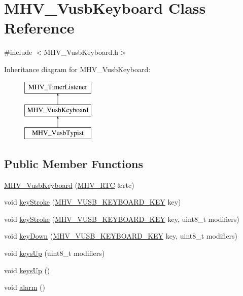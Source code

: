 \hypertarget{class_m_h_v___vusb_keyboard}{
\section{\-M\-H\-V\-\_\-\-Vusb\-Keyboard \-Class \-Reference}
\label{class_m_h_v___vusb_keyboard}
}


{\ttfamily \#include $<$\-M\-H\-V\-\_\-\-Vusb\-Keyboard.\-h$>$}

\-Inheritance diagram for \-M\-H\-V\-\_\-\-Vusb\-Keyboard\-:\begin{figure}[H]
\begin{center}
\leavevmode
\includegraphics[height=3.000000cm]{class_m_h_v___vusb_keyboard}
\end{center}
\end{figure}
\subsection*{\-Public \-Member \-Functions}
\begin{DoxyCompactItemize}
\item 
\hyperlink{class_m_h_v___vusb_keyboard_a97774c8ba7d4d9b736de5da63349a0b2}{\-M\-H\-V\-\_\-\-Vusb\-Keyboard} (\hyperlink{class_m_h_v___r_t_c}{\-M\-H\-V\-\_\-\-R\-T\-C} \&rtc)
\item 
void \hyperlink{class_m_h_v___vusb_keyboard_a01b3de864f8320c23118ac2ff34ca7a7}{key\-Stroke} (\hyperlink{_m_h_v___vusb_keyboard_8h_a03702cf5dad1661f75eda7bd2e33acb6}{\-M\-H\-V\-\_\-\-V\-U\-S\-B\-\_\-\-K\-E\-Y\-B\-O\-A\-R\-D\-\_\-\-K\-E\-Y} key)
\item 
void \hyperlink{class_m_h_v___vusb_keyboard_a6d2161121f4eaef0e41e2b6af956155f}{key\-Stroke} (\hyperlink{_m_h_v___vusb_keyboard_8h_a03702cf5dad1661f75eda7bd2e33acb6}{\-M\-H\-V\-\_\-\-V\-U\-S\-B\-\_\-\-K\-E\-Y\-B\-O\-A\-R\-D\-\_\-\-K\-E\-Y} key, uint8\-\_\-t modifiers)
\item 
void \hyperlink{class_m_h_v___vusb_keyboard_a879506b2ef1622e09070a9ccf11fdd10}{key\-Down} (\hyperlink{_m_h_v___vusb_keyboard_8h_a03702cf5dad1661f75eda7bd2e33acb6}{\-M\-H\-V\-\_\-\-V\-U\-S\-B\-\_\-\-K\-E\-Y\-B\-O\-A\-R\-D\-\_\-\-K\-E\-Y} key, uint8\-\_\-t modifiers)
\item 
void \hyperlink{class_m_h_v___vusb_keyboard_a0dd607bb70fe5f5354f407e8c4f12df1}{keys\-Up} (uint8\-\_\-t modifiers)
\item 
void \hyperlink{class_m_h_v___vusb_keyboard_a02ac5757295595e455ef3103d2ccc1de}{keys\-Up} ()
\item 
void \hyperlink{class_m_h_v___vusb_keyboard_a9d59ac54f1b17ece17c038dc3f5bd026}{alarm} ()
\end{DoxyCompactItemize}
